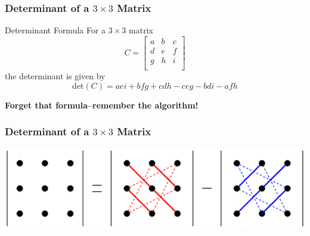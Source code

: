 \documentclass{beamer}
\begin{document}






\begin{frame}
  \frametitle{Determinant of a \(3 \times 3\) Matrix}

  \begin{block}{Determinant Formula}
     For a \(3 \times 3\) matrix
    \[
      C = \begin{bmatrix}
        a & b & c \\
        d & e & f \\
        g & h & i \\
      \end{bmatrix}
    \]
    the determinant is given by
    \[
      \text{det}(C) = aei + bfg + cdh - ceg - bdi - afh
    \]
  \end{block}

  \pause

\textbf{Forget that formula--remember the algorithm!}


\end{frame}

\begin{frame}
  \frametitle{Determinant of a \(3 \times 3\) Matrix}

  \begin{center}
    \includegraphics[width=\textwidth, height=\textheight, keepaspectratio]{det.png}
  \end{center}
  \end{frame}
\end{document}
